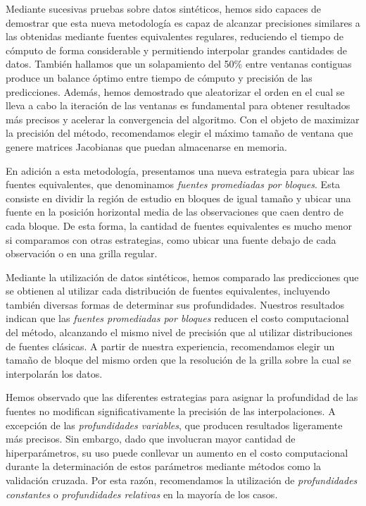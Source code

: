 Mediante sucesivas pruebas sobre datos sintéticos, hemos sido capaces de
demostrar que esta nueva metodología es capaz de alcanzar precisiones similares
a las obtenidas mediante fuentes equivalentes regulares, reduciendo el tiempo
de cómputo de forma considerable y permitiendo interpolar grandes cantidades de
datos.
También hallamos que un solapamiento del 50\% entre ventanas contiguas produce
un balance óptimo entre tiempo de cómputo y precisión de las predicciones.
Además, hemos demostrado que aleatorizar el orden en el cual se lleva a cabo la
iteración de las ventanas es fundamental para obtener resultados más precisos
y acelerar la convergencia del algoritmo.
Con el objeto de maximizar la precisión del método, recomendamos elegir el
máximo tamaño de ventana que genere matrices Jacobianas que puedan almacenarse
en memoria.

En adición a esta metodología, presentamos una nueva estrategia para ubicar las
fuentes equivalentes, que denominamos \emph{fuentes promediadas por bloques}.
Esta consiste en dividir la región de estudio en bloques de igual tamaño
y ubicar una fuente en la posición horizontal media de las observaciones que
caen dentro de cada bloque.
De esta forma, la cantidad de fuentes equivalentes es mucho menor si comparamos
con otras estrategias, como ubicar una fuente debajo de cada observación o en
una grilla regular.

Mediante la utilización de datos sintéticos, hemos comparado las predicciones
que se obtienen al utilizar cada distribución de fuentes equivalentes,
incluyendo también diversas formas de determinar sus profundidades.
Nuestros resultados indican que las \emph{fuentes promediadas por bloques}
reducen el costo computacional del método, alcanzando el mismo nivel de
precisión que al utilizar distribuciones de fuentes clásicas.
A partir de nuestra experiencia, recomendamos elegir un tamaño de bloque del
mismo orden que la resolución de la grilla sobre la cual se interpolarán los
datos.

Hemos observado que las diferentes estrategias para asignar la profundidad de
las fuentes no modifican significativamente la precisión de las
interpolaciones.
A excepción de las \emph{profundidades variables}, que producen resultados
ligeramente más precisos.
Sin embargo, dado que involucran mayor cantidad de hiperparámetros, su uso
puede conllevar un aumento en el costo computacional durante la determinación
de estos parámetros mediante métodos como la validación cruzada.
Por esta razón, recomendamos la utilización de \emph{profundidades constantes}
o \emph{profundidades relativas} en la mayoría de los casos.

